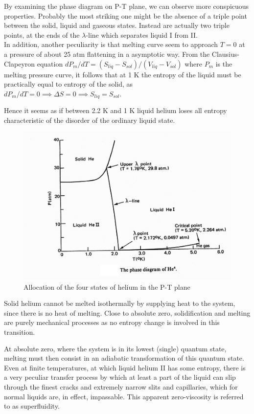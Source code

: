 \documentclass{article}
\begin{document}
By examining the phase diagram on P-T plane, we can observe more conspicuous properties. Probably the most striking one might be the absence of a triple point between the solid, liquid and gaseous states. Instead are actually two triple points, at the ends of the $\lambda$-line which separates liquid  I from  II\@.
\\

In addition, another peculiarity is that melting curve seem to approach $T = 0$ at a pressure of about 25 atm flattening in a asymptotic way. From the Clausius-Clapeyron equation $dP_m / dT =(S_{liq}-S_{sol})/(V_{liq}-V_{sol})$ where $P_m$ is the melting pressure curve, it follows that at 1 K the entropy of the liquid must be practically equal to entropy of the solid, as $dP_m / dT = 0 \implies \Delta S = 0 \implies S_{liq}=S_{sol}$.

Hence it seems as if between 2.2 K and 1 K liquid helium loses all entropy characteristic of the disorder of the ordinary liquid state.
\\

\begin{figure}[H]
    \centering
    \includegraphics[width=0.75\linewidth]{Images/PhaseDiagr.png}
    \caption{Allocation of the four states of helium in the P-T plane}
    \label{fig:enter-label}
\end{figure}

Solid helium cannot be melted isothermally by supplying heat to the system, since there is no heat of melting. Close to absolute zero, solidification and melting are purely mechanical processes as no entropy change is involved in this transition.

At absolute zero, where the system is in its lowest (single) quantum state, melting must then consist in an adiabatic transformation of this quantum state. Even at finite temperatures, at which liquid helium II has some entropy, there is a very peculiar transfer process by which at least a part of the liquid can slip through the finest cracks and extremely narrow slits and capillaries, which for normal liquids are, in effect, impassable. This apparent zero-viscosity is referred to as superfluidity.
\\
\end{document}
